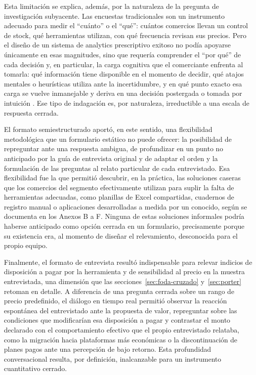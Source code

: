 Esta limitación se explica, además, por la naturaleza de la pregunta de investigación subyacente. Las encuestas tradicionales son un instrumento adecuado para medir el \enquote{cuánto} o el \enquote{qué}: cuántos comercios llevan un control de stock, qué herramientas utilizan, con qué frecuencia revisan sus precios. Pero el diseño de un sistema de analytics prescriptivo exitoso no podía apoyarse únicamente en esas magnitudes, sino que requería comprender el \enquote{por qué} de cada decisión y, en particular, la carga cognitiva que el comerciante enfrenta al tomarla: qué información tiene disponible en el momento de decidir, qué atajos mentales o heurísticas utiliza ante la incertidumbre, y en qué punto exacto esa carga se vuelve inmanejable y deriva en una decisión postergada o tomada por intuición \parencite{Kahneman2011}. Ese tipo de indagación es, por naturaleza, irreductible a una escala de respuesta cerrada.

El formato semiestructurado aportó, en este sentido, una flexibilidad metodológica que un formulario estático no puede ofrecer: la posibilidad de repreguntar ante una respuesta ambigua, de profundizar en un punto no anticipado por la guía de entrevista original y de adaptar el orden y la formulación de las preguntas al relato particular de cada entrevistado. Esa flexibilidad fue la que permitió descubrir, en la práctica, las soluciones caseras que los comercios del segmento efectivamente utilizan para suplir la falta de herramientas adecuadas, como planillas de Excel compartidas, cuadernos de registro manual o aplicaciones desarrolladas a medida por un conocido, según se documenta en los Anexos B a F. Ninguna de estas soluciones informales podría haberse anticipado como opción cerrada en un formulario, precisamente porque su existencia era, al momento de diseñar el relevamiento, desconocida para el propio equipo.

Finalmente, el formato de entrevista resultó indispensable para relevar indicios de disposición a pagar por la herramienta y de sensibilidad al precio en la muestra entrevistada, una dimensión que las secciones~\ref{sec:foda-cruzado} y~\ref{sec:porter} retoman en detalle. A diferencia de una pregunta cerrada sobre un rango de precio predefinido, el diálogo en tiempo real permitió observar la reacción espontánea del entrevistado ante la propuesta de valor, repreguntar sobre las condiciones que modificarían esa disposición a pagar y contrastar el monto declarado con el comportamiento efectivo que el propio entrevistado relataba, como la migración hacia plataformas más económicas o la discontinuación de planes pagos ante una percepción de bajo retorno. Esta profundidad conversacional resulta, por definición, inalcanzable para un instrumento cuantitativo cerrado.

